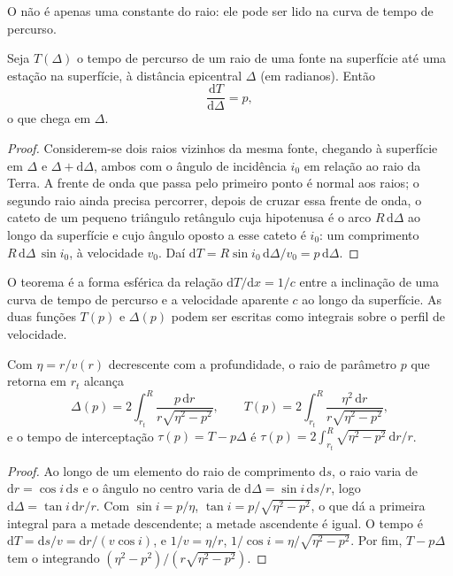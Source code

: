 O  não é apenas uma constante do raio: ele pode ser lido na
curva de tempo de percurso.

\begin{theorem}\label{thm:b3:seismology-imaging:benndorf}
Seja $T(\Delta)$ o tempo de percurso de um raio de uma fonte na superfície até
uma estação na superfície, à distância epicentral $\Delta$ (em radianos). Então
\[
  \frac{\mathrm dT}{\mathrm d\Delta} = p ,
\]
o  que chega em $\Delta$.
\end{theorem}

\begin{proof}
Considerem-se dois raios vizinhos da mesma fonte, chegando à superfície
em $\Delta$ e $\Delta + \mathrm d\Delta$, ambos com o ângulo de incidência $i_0$
em relação ao raio da Terra. A frente de onda que passa pelo primeiro ponto é
normal aos raios; o segundo raio ainda precisa percorrer, depois de cruzar
essa frente de onda, o cateto de um pequeno triângulo retângulo cuja hipotenusa
é o arco $R\,\mathrm d\Delta$ ao longo da superfície e cujo ângulo oposto a
esse cateto é $i_0$: um comprimento $R\,\mathrm d\Delta\,\sin i_0$, à velocidade $v_0$. Daí
$\mathrm dT = R\sin i_0\,\mathrm d\Delta/v_0 = p\,\mathrm d\Delta$.
\end{proof}

O teorema é a forma esférica da relação $\mathrm dT/\mathrm dx = 1/c$
entre a inclinação de uma curva de tempo de percurso e a velocidade aparente $c$ ao
longo da superfície. As duas funções $T(p)$ e $\Delta(p)$ podem ser escritas como integrais
sobre o perfil de velocidade.

\begin{proposition}\label{prop:b3:seismology-imaging:integrals}
Com $\eta = r/v(r)$ decrescente com a profundidade, o raio de parâmetro $p$ que retorna
em $r_t$ alcança
\[
  \Delta(p) = 2\int_{r_t}^{R}\frac{p\,\mathrm dr}{r\sqrt{\eta^2 - p^2}},
  \qquad
  T(p) = 2\int_{r_t}^{R}\frac{\eta^2\,\mathrm dr}{r\sqrt{\eta^2 - p^2}},
\]
e o tempo de interceptação $\tau(p) = T - p\Delta$ é
$\tau(p) = 2\int_{r_t}^{R}\sqrt{\eta^2 - p^2}\,\mathrm dr/r$.
\end{proposition}

\begin{proof}
Ao longo de um elemento do raio de comprimento $\mathrm ds$, o raio varia de
$\mathrm dr = \cos i\,\mathrm ds$ e o ângulo no centro varia de
$\mathrm d\Delta = \sin i\,\mathrm ds/r$, logo $\mathrm d\Delta = \tan i\,\mathrm dr/r$.
Com $\sin i = p/\eta$, $\tan i = p/\sqrt{\eta^2 - p^2}$, o que dá a primeira
integral para a metade descendente; a metade ascendente é igual. O tempo é
$\mathrm dT = \mathrm ds/v = \mathrm dr/(v\cos i)$, e $1/v = \eta/r$,
$1/\cos i = \eta/\sqrt{\eta^2 - p^2}$. Por fim, $T - p\Delta$ tem o integrando
$(\eta^2 - p^2)/(r\sqrt{\eta^2 - p^2})$.
\end{proof}

